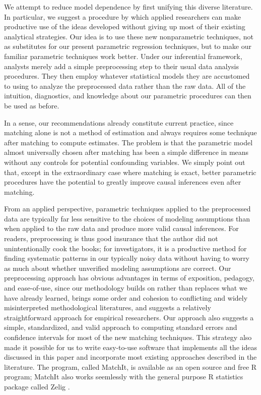 \documentclass[11pt,titlepage]{article}
\begin{document}
We attempt to reduce model dependence by first unifying this diverse
literature.  In particular, we suggest a procedure by which applied
researchers can make productive use of the ideas developed without
giving up most of their existing analytical strategies.  Our idea is
to use these new nonparametric techniques, not as substitutes for our
present parametric regression techniques, but to make our familiar
parametric techniques work better.  Under our inferential framework,
analysts merely add a simple preprocessing step to their usual data
analysis procedures.  They then employ whatever statistical models
they are accustomed to using to analyze the preprocessed data rather
than the raw data.  All of the intuition, diagnostics, and knowledge
about our parametric procedures can then be used as before.

In a sense, our recommendations already constitute current practice,
since matching alone is not a method of estimation and always requires
some technique after matching to compute estimates.  The problem is
that the parametric model almost universally chosen after matching has
been a simple difference in means without any controls for potential
confounding variables.  We simply point out that, except in the
extraordinary case where matching is exact, better parametric
procedures have the potential to greatly improve causal inferences
even after matching.

From an applied perspective, parametric techniques applied to the
preprocessed data are typically far less sensitive to the choices of
modeling assumptions than when applied to the raw data and produce
more valid causal inferences.  For readers, preprocessing is thus good
insurance that the author did not unintentionally cook the books; for
investigators, it is a productive method for finding systematic
patterns in our typically noisy data without having to worry as much
about whether unverified modeling assumptions are correct.  Our
preprocessing approach has obvious advantages in terms of exposition,
pedagogy, and ease-of-use, since our methodology builds on rather than
replaces what we have already learned, brings some order and cohesion
to conflicting and widely misinterpreted methodological literatures,
and suggests a relatively straightforward approach for empirical
researchers. Our approach also suggests a simple, standardized, and
valid approach to computing standard errors and confidence intervals
for most of the new matching techniques.  This strategy also made it
possible for us to write easy-to-use software that implements all the
ideas discussed in this paper and incorporate most existing
approaches described in the literature.  The program, called MatchIt,
is available as an open source and free R program; MatchIt also works
seemlessly with the general purpose R statistics package called Zelig
\citep{ImaKinLau04}.
\end{document}
